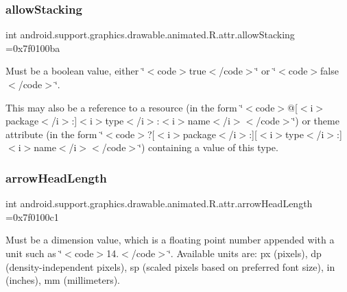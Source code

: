 \subsubsection{\texorpdfstring{allow\+Stacking}{allowStacking}}
{\footnotesize\ttfamily int android.\+support.\+graphics.\+drawable.\+animated.\+R.\+attr.\+allow\+Stacking =0x7f0100ba\hspace{0.3cm}{\ttfamily [static]}}

Must be a boolean value, either \char`\"{}$<$code$>$true$<$/code$>$\char`\"{} or \char`\"{}$<$code$>$false$<$/code$>$\char`\"{}. 

This may also be a reference to a resource (in the form \char`\"{}$<$code$>$@\mbox{[}$<$i$>$package$<$/i$>$\+:\mbox{]}$<$i$>$type$<$/i$>$\+:$<$i$>$name$<$/i$>$$<$/code$>$\char`\"{}) or theme attribute (in the form \char`\"{}$<$code$>$?\mbox{[}$<$i$>$package$<$/i$>$\+:\mbox{]}\mbox{[}$<$i$>$type$<$/i$>$\+:\mbox{]}$<$i$>$name$<$/i$>$$<$/code$>$\char`\"{}) containing a value of this type. \mbox{\label{classandroid_1_1support_1_1graphics_1_1drawable_1_1animated_1_1R_1_1attr_a0c4016a75f4c32648d1506816605ef88}} 
\subsubsection{\texorpdfstring{arrow\+Head\+Length}{arrowHeadLength}}
{\footnotesize\ttfamily int android.\+support.\+graphics.\+drawable.\+animated.\+R.\+attr.\+arrow\+Head\+Length =0x7f0100c1\hspace{0.3cm}{\ttfamily [static]}}

Must be a dimension value, which is a floating point number appended with a unit such as \char`\"{}$<$code$>$14.\+5sp$<$/code$>$\char`\"{}. Available units are\+: px (pixels), dp (density-\/independent pixels), sp (scaled pixels based on preferred font size), in (inches), mm (millimeters). 

